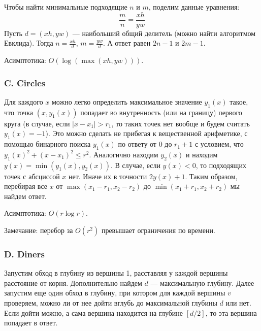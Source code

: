 Чтобы найти минимальные подходящие $n$ и $m$, поделим данные уравнения:
$$ \frac{m}{n} = \frac{x h}{y w}$$
Пусть $d = (xh, yw)$ --- наибольший общий делитель (можно найти алгоритмом Евклида). Тогда $n = \frac{xh}{d}$, $m = \frac{yw}{d}$. А ответ равен $2n-1$ и $2m - 1$. 

Асимптотика: $O(\log(\max(xh, yw)))$.


\subsubsection*{C. Circles}


\begin{center}
\end{center}

Для каждого $x$ можно легко определить максимальное значение $y_1(x)$ такое, что точка $(x, y_1(x))$ попадает во внутренность (или на границу) первого круга (в случае, если $|x - x_1| > r_1$, то таких точек нет вообще и будем считать $y_1(x) = -1$). Это можно сделать не прибегая к вещественной арифметике, с помощью бинарного поиска $y_1(x)$ по ответу от 0 до $r_1 + 1$ с условием, что  $y_1(x)^2 + (x - x_1)^2 \leqslant r^2$. Аналогично находим $y_2(x)$ и находим $y(x) = \min(y_1(x), y_2(x))$. В случае, если $y(x) < 0$, то подходящих точек с абсциссой $x$ нет. Иначе их в точности $2 y(x) + 1$. Таким образом, перебирая все $x$ от $\max(x_1 - r_1, x_2 - r_2)$ до $\min(x_1 + r_1, x_2 + r_2)$ мы найдем ответ.

Асимптотика: $O(r \log r)$.

Замечание: перебор за $O(r^2)$ превышает ограничения по времени.

\subsubsection*{D. Diners}


Запустим обход в глубину из вершины 1, расставляя у каждой вершины расстояние от корня. Дополнительно найдем $d$ --- максимальную глубину. Далее запустим еще один обход в глубину, при котором для каждой вершины $v$ проверяем, можно ли от нее дойти вглубь до максимальной глубины $d$ или нет. Если дойти можно, а сама вершина находится на глубине $[d/2]$, то эта вершина попадает в ответ.

